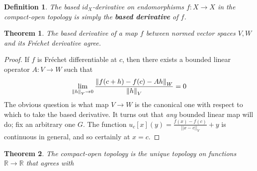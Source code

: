 \documentclass{article}
\newtheorem{thm}{Theorem}
\newtheorem*{define}{Definition}
\begin{document}
\begin{define}
  The based $id_{X}$-derivative on endomorphisms $f: X \to X$ in the compact-open topology is simply the \textbf{based derivative} of $f$.
\end{define}


\begin{thm}
  The based derivative of a map $f$ between normed vector spaces $V, W$ and its Fr\'echet derivative agree.
\end{thm}

\begin{proof}
  If $f$ is Fr\'echet differentiable at $c$, then there exists a bounded linear operator $A: V \to W$ such that
  \[
    \lim_{\norm{h}_{V} \to 0}\frac{\norm{f(c + h) - f(c) - Ah}_{W}}{\norm{h}_{V}} = 0
  \]
  The obvious question is what map $V \to W$ is the canonical one with respect to which to take the based derivative.
  It turns out that \textit{any} bounded linear map will do; fix an arbitrary one $G$.
  The function $u_{c}[x](y) = \frac{f(x) - f(c)}{||x - c||_{V}} + y$ is continuous in general, and so certainly at $x = c$.


\end{proof}

\begin{thm}
  The compact-open topology is the unique topology on functions $\mathbb{R} \to \mathbb{R}$ that agrees with
\end{thm}
\end{document}
